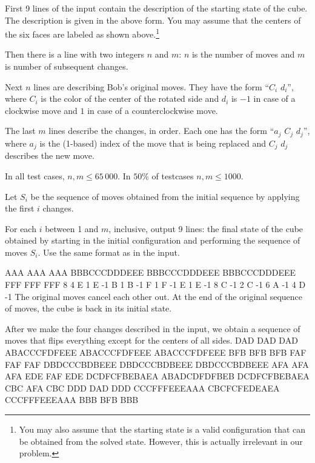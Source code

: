 
First 9 lines of the input contain the description of
the starting state of the cube. The description is given
in the above form. You may assume that the centers of the 
six faces are labeled as shown above.\footnote{You may also assume
that the starting state is a valid configuration that can be obtained
from the solved state. However, this is actually irrelevant in our problem.}

Then there is a line with two integers $n$ and $m$:
$n$ is the number of moves and $m$ is number of subsequent changes.

Next $n$ lines are describing Bob's original moves.
They have the form ``$C_i$ $d_i$'',
where $C_i$ is the color of the center of the rotated side
and $d_i$ is $-1$ in case of a clockwise move
and $1$ in case of a counterclockwise move.

The last $m$ lines describe the changes, in order.
Each one has the form ``$a_j$ $C_j$ $d_j$'',
where $a_j$ is the (1-based) index of the move that
is being replaced and $C_j$ $d_j$ describes the 
new move.


In all test cases, $n,m \leq 65\,000$. In $50\%$ of testcases $n,m \leq 1000$.

\newpage


Let $S_i$ be the sequence of moves obtained from the initial sequence
by applying the first $i$ changes.

For each $i$ between 1 and $m$, inclusive, output 9 lines: the final state 
of the cube obtained by starting in the initial configuration and performing
the sequence of moves $S_i$. Use the same format as in the input.


\sampleIN
AAA
AAA
AAA
BBBCCCDDDEEE
BBBCCCDDDEEE
BBBCCCDDDEEE
FFF
FFF
FFF
8 4
E 1
E -1
B 1
B -1
F 1
F -1
E 1
E -1
8 C -1
2 C -1
6 A -1
4 D -1
\sampleCOMMENT
The original moves cancel each other out.
At the end of the original sequence of moves,
the cube is back in its initial state.

After we make the four changes described in the input,
we obtain a sequence of moves that flips everything
except for the centers of all sides.
\sampleOUT
DAD
DAD
DAD
ABACCCFDFEEE
ABACCCFDFEEE
ABACCCFDFEEE
BFB
BFB
BFB
FAF
FAF
FAF
DBDCCCBDBEEE
DBDCCCBDBEEE
DBDCCCBDBEEE
AFA
AFA
AFA
EDE
FAF
EDE
DCDFCFBEBAEA
ABADCDFDFBEB
DCDFCFBEBAEA
CBC
AFA
CBC
DDD
DAD
DDD
CCCFFFEEEAAA
CBCFCFEDEAEA
CCCFFFEEEAAA
BBB
BFB
BBB
\sampleEND



